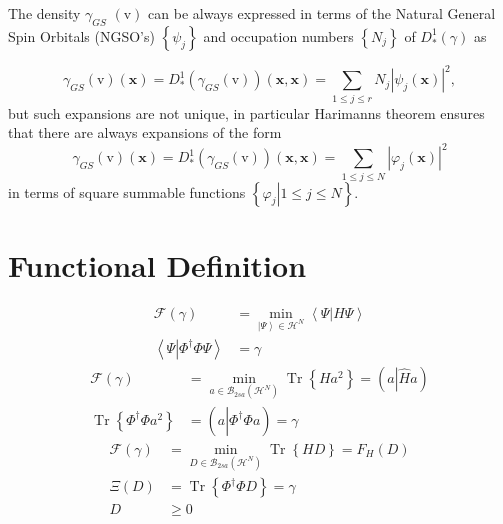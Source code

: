 \documentclass[aps,preprint]{revtex4}%
\begin{document}
The density $\gamma_{GS}$ $\left(  \mathrm{v}\right)  $ can be always
expressed in terms of the Natural General Spin Orbitals (NGSO's) $\left\{
\psi_{j}\right\}  $ and occupation numbers $\left\{  N_{j}\right\}  $ of
$D_{\ast}^{1}\left(  \gamma\right)  $ as%

\begin{equation}
\gamma_{GS}\left(  \mathrm{v}\right)  \left(  \mathbf{x}\right)  =D_{\ast}%
^{1}\left(  \gamma_{GS}\left(  \mathrm{v}\right)  \right)  \left(
\mathbf{x,x}\right)  =\sum_{1\leq j\leq r}N_{j}\left\vert \psi_{j}\left(
\mathbf{x}\right)  \right\vert ^{2},
\end{equation}
but such expansions are not unique, in particular Harimanns \cite{Harimann}
theorem ensures that there are always expansions of the form
\begin{equation}
\gamma_{GS}\left(  \mathrm{v}\right)  \left(  \mathbf{x}\right)  =D_{\ast}%
^{1}\left(  \gamma_{GS}\left(  \mathrm{v}\right)  \right)  \left(
\mathbf{x,x}\right)  =\sum_{1\leq j\leq N}\left\vert \varphi_{j}\left(
\mathbf{x}\right)  \right\vert ^{2}%
\end{equation}
in terms of square summable functions $\left\{  \left.  \varphi_{j}\right\vert
1\leq j\leq N\right\}  $.

\section{Functional Definition}%

\begin{align}
\mathcal{F}\left(  \gamma\right)   &  =\min_{\left\vert \Psi\right\rangle
\in\mathcal{H}^{N}}\left\langle \Psi\left\vert H\Psi\right.  \right\rangle
\nonumber\\
\left\langle \Psi\left\vert \Phi^{\dagger}\Phi\Psi\right.  \right\rangle  &
=\gamma
\end{align}%
\begin{align}
\mathcal{F}\left(  \gamma\right)   &  =\min_{a\in\mathcal{B}_{2sa}\left(
\mathcal{H}^{N}\right)  }\operatorname{Tr}\left\{  Ha^{2}\right\}  =\left(
a\left\vert \hat{H}a\right.  \right) \nonumber\\
\operatorname{Tr}\left\{  \Phi^{\dagger}\Phi a^{2}\right\}   &  =\left(
a\left\vert \widehat{\Phi^{\dagger}\Phi}a\right.  \right)  =\gamma
\end{align}%
\begin{align}
\mathcal{F}\left(  \gamma\right)   &  =\min_{D\in\mathcal{B}_{2sa}\left(
\mathcal{H}^{N}\right)  }\operatorname{Tr}\left\{  HD\right\}  =F_{H}\left(
D\right) \nonumber\\
\Xi\left(  D\right)   &  =\operatorname{Tr}\left\{  \Phi^{\dagger}\Phi
D\right\}  =\gamma\nonumber\\
D  &  \geq0
\end{align}
\end{document}
